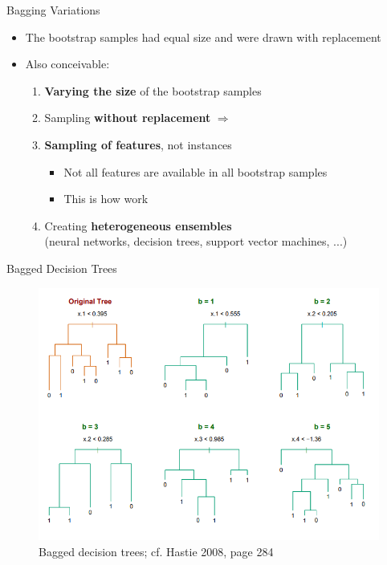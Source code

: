 \begin{frame}[plain]{}{}
	
\end{frame}


\begin{frame}{Bagging Variations}{}
	\begin{itemize}
		\item The bootstrap samples had equal size and were drawn with replacement
		\item Also conceivable:
		\begin{enumerate}
			\item \textbf{Varying the size} of the bootstrap samples
			\item Sampling \textbf{without replacement} $\Rightarrow$ 
			\item \textbf{Sampling of features}, not instances
			\begin{itemize}
				\item Not all features are available in all bootstrap samples
				\item This is how  work
			\end{itemize}
			\item Creating \textbf{heterogeneous ensembles} \\
				(neural networks, decision trees, support vector machines, ...)
		\end{enumerate}
	\end{itemize}
\end{frame}


\begin{frame}{Bagged Decision Trees}{}
	\begin{figure}
		\includegraphics[scale=0.35]{08_decision_trees/02_img/bagged_decision_trees}
		\vspace*{-4mm}
		\caption{Bagged decision trees; cf. Hastie 2008, page 284}
	\end{figure}
\end{frame}



